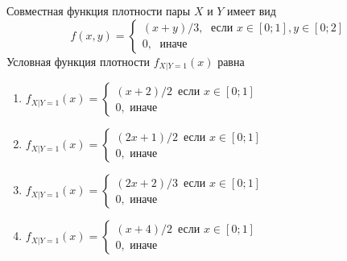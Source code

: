 \documentclass[t]{beamer}
\begin{document}
 \begin{frame} \label{23} 
\begin{block}{23} 

Совместная функция плотности пары $X$ и $Y$ имеет вид
\[
f(x,y)=\begin{cases}
(x+y)/3, \; \text{ если } x\in[0;1], y\in [0;2] \\
0, \; \text{ иначе}
\end{cases}
\]
Условная функция плотности  $f_{X|Y=1}(x)$ равна

 \end{block} 
\begin{enumerate} 
\item[] \hyperlink{23-No}{\beamergotobutton{} $f_{X|Y=1}(x)=\begin{cases} (x+2)/2\, \text{ если } x\in [0;1] \\ 0, \text{ иначе }    \end{cases}$}
\item[] \hyperlink{23-No}{\beamergotobutton{} $f_{X|Y=1}(x)=\begin{cases} (2x+1)/2\, \text{ если } x\in [0;1] \\ 0, \text{ иначе }    \end{cases}$}
\item[] \hyperlink{23-Yes}{\beamergotobutton{} $f_{X|Y=1}(x)=\begin{cases} (2x+2)/3\, \text{ если } x\in [0;1] \\ 0, \text{ иначе }    \end{cases}$}
\item[] \hyperlink{23-No}{\beamergotobutton{} $f_{X|Y=1}(x)=\begin{cases} (x+4)/2\, \text{ если } x\in [0;1] \\ 0, \text{ иначе }    \end{cases}$}
\end{enumerate} 
\end{frame} 
\end{document}
